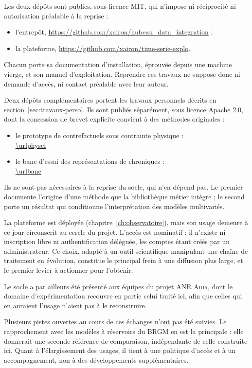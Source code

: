 Les deux dépôts sont publics, sous licence MIT, qui n'impose ni réciprocité ni autorisation
préalable à la reprise :

\begin{itemize}
  \item l'entrepôt, \url{https://github.com/xairon/hubeau_data_integration} ;
  \item la plateforme, \url{https://github.com/xairon/time-serie-explo}.
\end{itemize}

\noindent
Chacun porte sa documentation d'installation, éprouvée depuis une machine vierge, et son manuel
d'exploitation. Reprendre ces travaux ne suppose donc ni demande d'accès, ni contact préalable
avec leur auteur.

Deux dépôts complémentaires portent les travaux personnels décrits en
section~\ref{sec:travaux-perso}. Ils sont publiés séparément, sous licence Apache 2.0, dont la
concession de brevet explicite convient à des méthodes originales :

\begin{itemize}
  \item le prototype de contrefactuels sous contrainte physique :\\
        \url{\urlphyscf}
  \item le banc d'essai des représentations de chroniques :\\
        \url{\urlbanc}
\end{itemize}

\noindent
Ils ne sont pas nécessaires à la reprise du socle, qui n'en dépend pas. Le premier documente
l'origine d'une méthode que la bibliothèque métier intègre ; le second porte un résultat qui
conditionne l'interprétation des modèles multivariés.

La plateforme est déployée (chapitre~\ref{ch:observatoire}), mais son usage demeure à ce jour
circonscrit au cercle du projet. L'accès est nominatif : il n'existe ni inscription libre ni
authentification déléguée, les comptes étant créés par un administrateur. Ce choix, adapté à un
outil scientifique manipulant une chaîne de traitement en évolution, constitue le principal frein
à une diffusion plus large, et le premier levier à actionner pour l'obtenir.

Le socle a par ailleurs été présenté aux équipes du projet ANR \textsc{Aida}, dont le domaine
d'expérimentation recouvre en partie celui traité ici, afin que celles qui en auraient l'usage
n'aient pas à le reconstruire.

Plusieurs pistes ouvertes au cours de ces échanges n'ont pas été suivies. Le rapprochement avec
les modèles à réservoirs du BRGM en est la principale : elle donnerait une seconde référence de
comparaison, indépendante de celle construite ici. Quant à l'élargissement des usages, il tient à
une politique d'accès et à un accompagnement, non à des développements supplémentaires.
